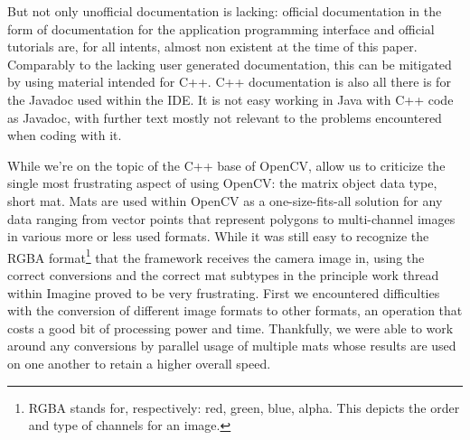 But not only unofficial documentation is lacking: official documentation in the form of documentation for the application programming interface and official tutorials are, for all intents, almost non existent at the time of this paper.
Comparably to the lacking user generated documentation, this can be mitigated by using material intended for C++.
C++ documentation is also all there is for the Javadoc used within the IDE.
It is not easy working in Java with C++ code as Javadoc, with further text mostly not relevant to the problems encountered when coding with it.

While we're on the topic of the C++ base of OpenCV, allow us to criticize the single most frustrating aspect of using OpenCV: the matrix object data type, short mat.
Mats are used within OpenCV as a one-size-fits-all solution for any data ranging from vector points that represent polygons to multi-channel images in various more or less used formats.
While it was still easy to recognize the RGBA format\footnote{RGBA stands for, respectively: red, green, blue, alpha. This depicts the order and type of channels for an image.} that the framework receives the camera image in, using the correct conversions and the correct mat subtypes in the principle work thread within Imagine proved to be very frustrating.
First we encountered difficulties with the conversion of different image formats to other formats, an operation that costs a good bit of processing power and time.
Thankfully, we were able to work around any conversions by parallel usage of multiple mats whose results are used on one another to retain a higher overall speed.


